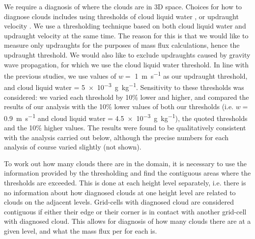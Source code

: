 \documentclass[11pt,a4paper]{article}
\newcommand*\mean[1]{\overline{#1}}
\newcommand\todo[1]{\textbf{TODO: #1}}
\begin{document}
We require a diagnosis of where the clouds are in 3D space. Choices for how to diagnose clouds includes using thresholds of cloud liquid water \parencite{CC2006II}, or updraught velocity \parencite{CC2006II, zipser1980cumulonimbus}. We use a thresholding technique based on both cloud liquid water and updraught velocity at the same time. The reason for this is that we would like to measure only updraughts for the purposes of mass flux calculations, hence the updraught threshold. We would also like to exclude updraughts caused by gravity wave propagation, for which we use the cloud liquid water threshold. In line with the previous studies, we use values of $w =$ \SI{1}{m.s^{-1}} as our updraught threshold, and cloud liquid water = \SI{5e-3}{g.kg^{-1}}. Sensitivity to these thresholds was considered: we varied each threshold by 10\% lower and higher, and compared the results of our analysis with the 10\% lower values of both our thresholds (i.e. $w =$ \SI{0.9}{m.s^{-1}} and cloud liquid water = \SI{4.5e-3}{g.kg^{-1}}), the quoted thresholds and the 10\% higher values. The results were found to be qualitatively consistent with the analysis carried out below, although the precise numbers for each analysis of course varied slightly (not shown).

To work out how many clouds there are in the domain, it is necessary to use the information provided by the thresholding and find the contiguous areas where the thresholds are exceeded. This is done at each height level separately, i.e. there is no information about how diagnosed clouds at one height level are related to clouds on the adjacent levels. Grid-cells with diagnosed cloud are considered contiguous if either their edge or their corner is in contact with another grid-cell with diagnosed cloud. This allows for diagnosis of how many clouds there are at a given level, and what the mass flux per for each is.
\end{document}

